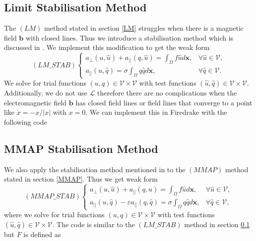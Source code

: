 \documentclass[12pt]{ociamthesis}
\begin{document}
\subsection{Limit Stabilisation Method} \label{LM_STAB}
The $(LM)$ method stated in section \ref{LM} struggles when there is a magnetic field $\mathbf{b}$ with closed lines. Thus we introduce a stabilisation method which is discussed in \cite{STAB}. We implement this modification to get the weak form
\begin{equation} \label{LM_STAB_w}
(LM\_STAB)
\begin{cases}
a_{\perp}(u, \hat{u}) + a_{||}(q, \hat{u}) = \int_{\Omega} f \hat{u} d\mathbf{x}, 
&\forall \hat{u} \in \mathcal{V},\\
a_{||}(u, \hat{q}) = \sigma \int_{\Omega} q \hat{q} d\mathbf{x}, & \forall \hat{q} \in \mathcal{V}.
\end{cases}
\end{equation}
We solve for trial functions $(u, q) \in \mathcal{V} \times \mathcal{V}$ with test functions $(\hat{u}, \hat{q}) \in \mathcal{V} \times \mathcal{V}$. Additionally, we do not use $\mathcal{L}$ therefore there are no complications when the electromagnetic field $\mathbf{b}$ has closed field lines or field lines that converge to a point like $\dot{x} = -x/|x|$ with $x=0$.
We can implement this in Firedrake \cite{Dragon} with the following code


\subsection{MMAP Stabilisation Method} \label{MMAP_STAB}
We also apply the stabilisation method mentioned in \cite{STAB} to the $(MMAP)$ method stated in section \ref{MMAP}. Thus we get weak form
\begin{equation} \label{MMAP_STAB_w}
(MMAP\_STAB)
\begin{cases}
a_{\perp}(u, \hat{u}) + a_{||}(q, \hat{u}) = \int_{\Omega} f \hat{u} d\mathbf{x}, 
&\forall \hat{u} \in \mathcal{V},\\
a_{||}(u, \hat{q}) - \varepsilon a_{||}(q, \hat{q}) = \sigma \int_{\Omega} q \hat{q} d\mathbf{x}, & \forall \hat{q}\in \mathcal{V},
\end{cases}
\end{equation}
where we solve for trial functions $(u,q) \in \mathcal{V} \times \mathcal{V}$ with test functions $(\hat{u}, \hat{q}) \in \mathcal{V} \times \mathcal{V}$. The code is similar to the $(LM\_STAB)$ method in section \ref{LM_STAB} but $F$ is defined as

\end{document}
